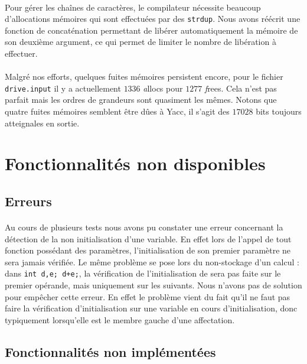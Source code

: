 \documentclass[a4paper,10pt]{article}
\begin{document}
\paragraph{}
Pour gérer les chaînes de caractères, le compilateur nécessite beaucoup d'allocations mémoires qui sont effectuées par des \verb!strdup!. Nous avons réécrit une fonction de concaténation permettant de libérer automatiquement la mémoire de son deuxième argument, ce qui permet de limiter le nombre de libération à effectuer.

\paragraph{}
Malgré nos efforts, quelques fuites mémoires persistent encore, pour le fichier \verb!drive.input! il y a actuellement $1336$ \emph allocs pour $1277$ \emph frees. Cela n'est pas parfait mais les ordres de grandeurs sont quasiment les mêmes. Notons que quatre fuites mémoires semblent être dûes à \textsf Yacc, il s'agit des $17028$ bits toujours atteignales en sortie.

\newpage
\section{Fonctionnalités non disponibles}

\subsection{Erreurs}

\paragraph{}
Au cours de plusieurs tests nous avons pu constater une erreur concernant la détection de la non initialisation d'une variable. En effet lors de l'appel de tout fonction possédant des paramètres, l'initialisation de son premier paramètre ne sera jamais vérifiée. Le même problème se pose lors du non-stockage d'un calcul : dans \verb!int d,e; d+e;!, la vérification de l'initialisation de sera pas faite sur le premier opérande, mais uniquement sur les suivants. Nous n'avons pas de solution pour empêcher cette erreur. En effet le problème vient du fait qu'il ne faut pas faire la vérification d'initialisation sur une variable en cours d'initialisation, donc typiquement lorsqu'elle est le membre gauche d'une affectation.

\subsection{Fonctionnalités non implémentées}
\end{document}
